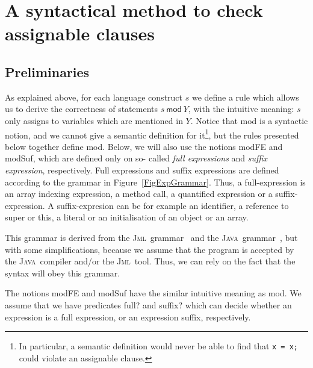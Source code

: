 \documentclass[a4paper]{llncs}
\newcommand{\jml}{\textsc{Jml}}
\newcommand{\java}{\textsc{Java}}
\newcommand{\MOD}[2]{\ensuremath{\mathit{#1}\:\mathsf{mod}\:\ensuremath{\mathit{#2}}}}
\begin{document}


\section{A syntactical method to check assignable clauses}
\label{sec-syn-met-che-ass-cla}

\subsection{Preliminaries}
As explained above, for each language construct \(s\) we define a rule
which allows us to derive the correctness of statements
\MOD{s}{Y}, with the intuitive meaning: \(s\) only assigns
to variables which are mentioned in \(Y\). Notice that \textsf{mod} is
a syntactic notion, and we cannot give a semantic definition for
it\footnote{In particular, a semantic definition would never be able
to find that \texttt{x = x;} could violate an assignable clause.}, but 
the rules presented below together define \textsf{mod}.
Below, we will also use the notions \textsf{modFE} and
\textsf{modSuf}, which are defined only on so- called \emph{full
expressions} and \emph{suffix expression}, respectively. Full
expressions and suffix expressions are defined according to the
grammar in Figure~\ref{FigExpGrammar}. Thus, a full-expression is an
array indexing expression, a method call, a quantified expression or a 
suffix-expression. A suffix-expresion can be for example an
identifier, a reference to super or this, a literal or an
initialisation of an object or an array.

This grammar is derived from
the \jml\ grammar~\cite{LeavensBR00} and the \java\
grammar~\cite{GoslingS?}, but with some simplifications, because we
assume that the program is accepted by the \java\ compiler and/or the
\jml\ tool. Thus, we can rely on the fact that the syntax will obey
this grammar.

The notions
\textsf{modFE} and \textsf{modSuf} have the similar intuitive meaning as
\textsf{mod}. We assume that we have predicates \textsf{full?} and
\textsf{suffix?} which can decide whether an expression is a full
expression, or an expression suffix, respectively.
\end{document}
